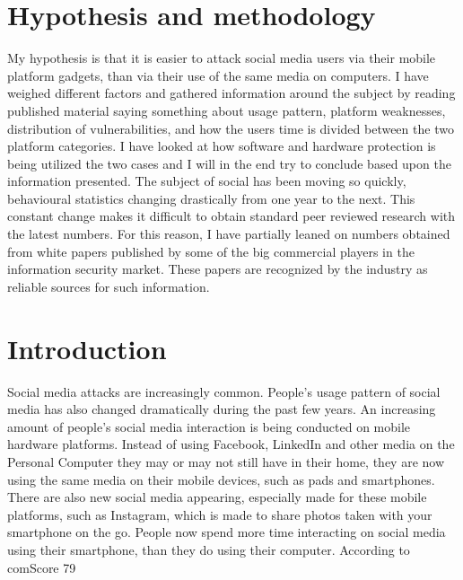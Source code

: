 \section{Hypothesis and methodology}
My hypothesis is that it is easier to attack social media users via their mobile platform gadgets, than via their use of the same media on computers. I have weighed different factors and gathered information around the subject by reading published material saying something about usage pattern, platform weaknesses, distribution of vulnerabilities, and how the users time is divided between the two platform categories. I have looked at how software and hardware protection is being utilized the two cases and I will in the end try to conclude based upon the information presented.
 The subject of social has been moving so quickly, behavioural statistics changing drastically from one year to the next. This constant change makes it difficult to obtain standard peer reviewed research with the latest numbers. For this reason, I have partially leaned on numbers obtained from white papers published by some of the big commercial players in the information security market. These papers are recognized by the industry as reliable sources for such information.
\section{Introduction}
Social media attacks are increasingly common. People’s usage pattern of social media has also changed dramatically during the past few years. An increasing amount of people’s social media interaction is being conducted on mobile hardware platforms. Instead of using Facebook, LinkedIn and other media on the Personal Computer they may or may not still have in their home, they are now using the same media on their mobile devices, such as pads and smartphones. There are also new social media appearing, especially made for these mobile platforms, such as Instagram, which is made to share photos taken with your smartphone on the go.
People now spend more time interacting on social media using their smartphone, than they do using their computer. According to comScore 79%
